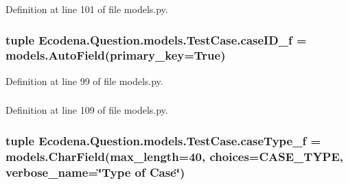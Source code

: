 Definition at line 101 of file models.py.

\hypertarget{class_ecodena_1_1_question_1_1models_1_1_test_case_a9448c3b3b6da8aba864e4b8bec30bb17}{
\subsubsection[{caseID\_\-f}]{\setlength{\rightskip}{0pt plus 5cm}tuple {\bf Ecodena.Question.models.TestCase.caseID\_\-f} = models.AutoField(primary\_\-key=True)}}
\label{d4/d96/class_ecodena_1_1_question_1_1models_1_1_test_case_a9448c3b3b6da8aba864e4b8bec30bb17}


Definition at line 99 of file models.py.

\hypertarget{class_ecodena_1_1_question_1_1models_1_1_test_case_ae271617c1377ad90ebc7227e91f0d0ee}{
\subsubsection[{caseID\_\-f}]{}}
\label{d4/d96/class_ecodena_1_1_question_1_1models_1_1_test_case_ae271617c1377ad90ebc7227e91f0d0ee}


Definition at line 109 of file models.py.

\hypertarget{class_ecodena_1_1_question_1_1models_1_1_test_case_a0fc9e08f3ccdc4e9590f7778eb685ba8}{
\subsubsection[{caseType\_\-f}]{\setlength{\rightskip}{0pt plus 5cm}tuple {\bf Ecodena.Question.models.TestCase.caseType\_\-f} = models.CharField(max\_\-length=40, choices={\bf CASE\_\-TYPE}, verbose\_\-name=\char`\"{}Type of Case\char`\"{})}}
\label{d4/d96/class_ecodena_1_1_question_1_1models_1_1_test_case_a0fc9e08f3ccdc4e9590f7778eb685ba8}


